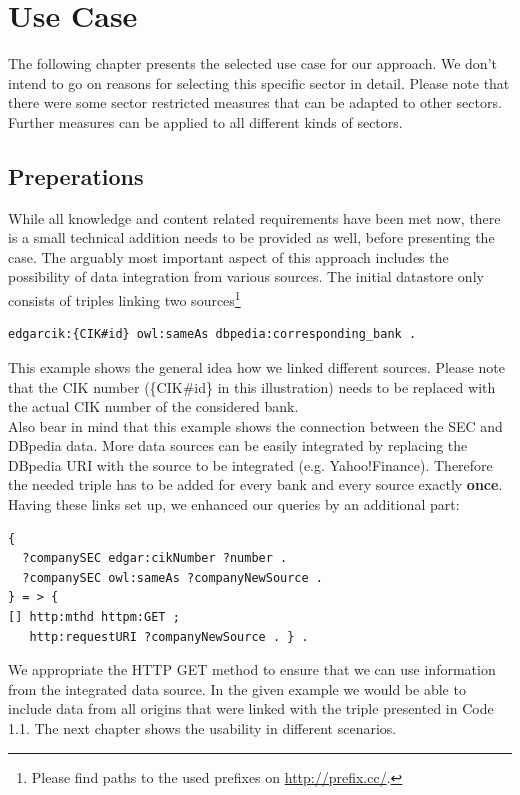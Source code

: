 \documentclass[runningheads]{llncs}
\begin{document}
\section{Use Case}
The following chapter presents the selected use case for our approach. We don't intend to go on reasons for selecting this specific sector in detail. Please note that there were some sector restricted measures that can be adapted to other sectors. Further measures can be applied to all different kinds of sectors.
\subsection{Preperations}
While all knowledge and content related requirements have been met now, there is a small technical addition needs to be provided as well, before presenting the case. The arguably most important aspect of this approach includes the possibility of data integration from various sources. The initial datastore only consists of triples linking two sources\footnote{Please find paths to the used prefixes on \url{http://prefix.cc/}.}
\begin{lstlisting}[caption= Linking resources using the owl:sameAs property]
edgarcik:{CIK#id} owl:sameAs dbpedia:corresponding_bank .
\end{lstlisting}
This example shows the general idea how we linked different sources. Please note that the CIK number (\{CIK\#id\} in this illustration) needs to be replaced with the actual CIK number of the considered bank. \\
Also bear in mind that this example shows the connection between the SEC and DBpedia data. More data sources can be easily integrated by replacing the DBpedia URI with the source to be integrated (e.g. Yahoo!Finance). Therefore the needed triple has to be added for every bank and every source exactly \textbf{once}. \\
Having these links set up, we enhanced our queries by an additional part\footnotemark[6]:
\begin{lstlisting}[caption= Using httpm:GET to access data from different sources]
{
  ?companySEC edgar:cikNumber ?number .
  ?companySEC owl:sameAs ?companyNewSource .
} = > {
[] http:mthd httpm:GET ;
   http:requestURI ?companyNewSource . } .
\end{lstlisting}
We appropriate the HTTP GET method to ensure that we can use information from the integrated data source. In the given example we would be able to include data from all origins that were linked with the triple presented in Code 1.1. The next chapter shows the usability in different scenarios.
\end{document}
